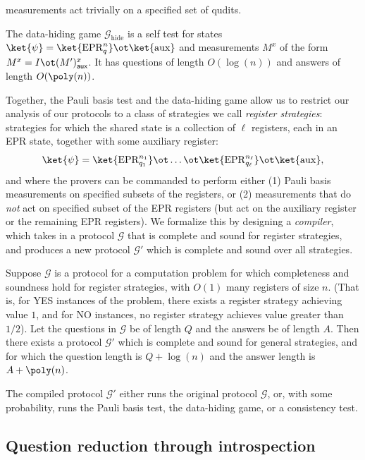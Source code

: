 \documentclass[11pt]{article}
\newcommand{\game}{\mathscr{G}}
\newcommand{\epr}{\mathrm{EPR}}
\newcommand{\rmaux}{\mathrm{aux}}
\newcommand{\reg}[1]{{\mathsf{#1}}}
\begin{document}
measurements act trivially on a specified set of qudits.
\begin{infthm}
  The data-hiding game $\game_{\mathrm{hide}}$ is a self test for
  states $\ket{\psi} = \ket{\epr_q^n} \ot \ket{\rmaux}$ and
  measurements $M^x$ of the form $M^x = I \ot (M')^x_{\reg{aux}}$. It
  has questions of length $O(\log(n))$ and answers of length $O(\poly(n))$.
\end{infthm}
Together, the Pauli basis test and the data-hiding game allow us to restrict our analysis of our protocols to a
class of strategies we call \emph{register strategies}: strategies for
which the shared state is a collection of $\ell$ registers, each in an
EPR state, together with some auxiliary register:
\[ \ket{\psi} = \ket{\epr_{q_1}^{n_1}} \ot \dots \ot
  \ket{\epr_{q_\ell}^{n_\ell}} \ot \ket{\rmaux}, \]
and where the provers can be commanded to perform either (1) Pauli basis measurements on specified subsets of the
registers, or (2) measurements that do \emph{not} act on specified
subset of the EPR registers (but act on the auxiliary register or the
remaining EPR registers). We formalize this by designing a \emph{compiler},
which takes in a protocol $\game$ that is complete and sound for register
strategies, and produces a new protocol $\game'$ which is complete and
sound over all strategies.
\begin{infthm}\label{thm:compileroonie}
  Suppose $\game$ is a protocol for a computation problem for which completeness and soundness
  hold for register strategies, with $O(1)$ many registers of size
  $n$. (That is, for YES instances of the problem, there exists a
  register strategy achieving value $1$, and for NO instances, no
  register strategy achieves value greater than $1/2$). Let the
  questions in $\game$ be of length $Q$ and the answers be of length
  $A$. Then there exists a protocol $\game'$ which is complete and
  sound for general strategies, and for which the question length is $Q
  + \log(n)$ and the answer length is $A + \poly(n)$.
\end{infthm}
The compiled protocol $\game'$ either runs the original protocol
$\game$, or, with some probability, runs the Pauli basis test, the
data-hiding game, or a consistency test.


\subsection{Question reduction through introspection}
\end{document}
